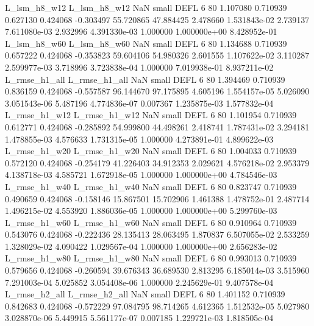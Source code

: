   L_lsm_h8_w12   L_lsm_h8_w12                   NaN      small     DEFL                 6 80 1.107080       0.710939 0.627130       0.424068   -0.303497     55.720865     47.884425     2.478660   1.531843e-02  2.739137 7.611080e-03     2.932996   4.391330e-03            1.000000    1.000000e+00        8.428952e-01
  L_lsm_h8_w60   L_lsm_h8_w60                   NaN      small     DEFL                 6 80 1.134688       0.710939 0.657222       0.424068   -0.353823     59.604106     54.980326     2.601555   1.107622e-02  3.110287 2.599977e-03     3.718996   3.723838e-04            1.000000    7.019938e-01        8.937211e-02
 L_rmse_h1_all  L_rmse_h1_all                   NaN      small     DEFL                 6 80 1.394469       0.710939 0.836159       0.424068   -0.557587     96.144670     97.175895     4.605196   1.554157e-05  5.026090 3.051543e-06     5.487196   4.774836e-07            0.007367    1.235875e-03        1.577832e-04
 L_rmse_h1_w12  L_rmse_h1_w12                   NaN      small     DEFL                 6 80 1.101954       0.710939 0.612771       0.424068   -0.285892     54.999800     44.498261     2.418741   1.787431e-02  3.294181 1.478855e-03     4.576633   1.731315e-05            1.000000    4.273891e-01        4.899622e-03
 L_rmse_h1_w20  L_rmse_h1_w20                   NaN      small     DEFL                 6 80 1.004033       0.710939 0.572120       0.424068   -0.254179     41.226403     34.912353     2.029621   4.576218e-02  2.953379 4.138718e-03     4.585721   1.672918e-05            1.000000    1.000000e+00        4.784546e-03
 L_rmse_h1_w40  L_rmse_h1_w40                   NaN      small     DEFL                 6 80 0.823747       0.710939 0.490659       0.424068   -0.158146     15.867501     15.702906     1.461388   1.478752e-01  2.487714 1.496215e-02     4.553920   1.886036e-05            1.000000    1.000000e+00        5.299760e-03
 L_rmse_h1_w60  L_rmse_h1_w60                   NaN      small     DEFL                 6 80 0.910964       0.710939 0.543076       0.424068   -0.222436     28.135413     28.063495     1.870837   6.507055e-02  2.533259 1.328029e-02     4.090422   1.029567e-04            1.000000    1.000000e+00        2.656283e-02
 L_rmse_h1_w80  L_rmse_h1_w80                   NaN      small     DEFL                 6 80 0.993013       0.710939 0.579656       0.424068   -0.260594     39.676343     36.689530     2.813295   6.185014e-03  3.515960 7.291003e-04     5.025852   3.054408e-06            1.000000    2.245629e-01        9.407578e-04
 L_rmse_h2_all  L_rmse_h2_all                   NaN      small     DEFL                 6 80 1.401152       0.710939 0.842683       0.424068   -0.572229     97.084795     98.714265     4.612365   1.512532e-05  5.027980 3.028870e-06     5.449915   5.561177e-07            0.007185    1.229721e-03        1.818505e-04
